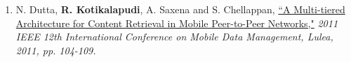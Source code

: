 \documentclass[a4paper,11pt]{article}
\begin{document}
\begin{enumerate}[1)]
    \item N. Dutta, \textbf{R. Kotikalapudi}, A. Saxena and S. Chellappan, \href{http://ieeexplore.ieee.org/stamp/stamp.jsp?tp=&arnumber=6068427&isnumber=6068399}{``A Multi-tiered Architecture for Content Retrieval in Mobile Peer-to-Peer Networks,"} \emph{2011 IEEE 12th International Conference on Mobile Data Management, Lulea, 2011, pp. 104-109.}

\end{enumerate}
\end{document}
